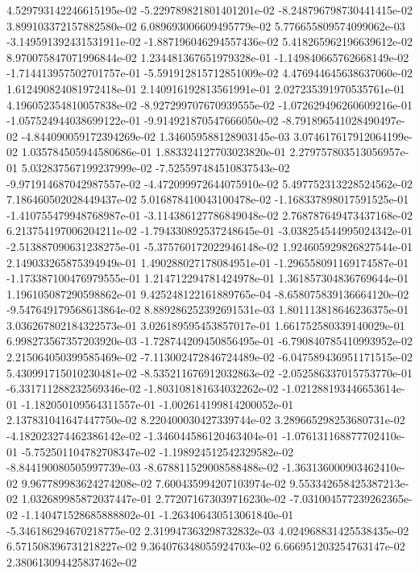 4.529793142246615195e-02
-5.229789821801401201e-02
-8.248796798730441415e-02
3.899103372157882580e-02
6.089693006609495779e-02
5.776655809574099062e-03
-3.149591392431531911e-02
-1.887196046294557436e-02
5.418265962196639612e-02
8.970075847071996844e-02
1.234481367651979328e-01
-1.149840665762668149e-02
-1.714413957502701757e-01
-5.591912815712851009e-02
4.476944645638637060e-02
1.612490824081972418e-01
2.140916192813561991e-01
2.027235391970535761e-01
4.196052354810057838e-02
-8.927299707670939555e-02
-1.072629496260609216e-01
-1.057524944038699122e-01
-9.914921870547666050e-02
-8.791896541028490497e-02
-4.844090059172394269e-02
1.346059588128903145e-03
3.074617617912064199e-02
1.035784505944580686e-01
1.883324127703023820e-01
2.279757803513056957e-01
5.032837567199237999e-02
-7.525597484510837543e-02
-9.971914687042987557e-02
-4.472099972644075910e-02
5.497752313228524562e-02
7.186460502028449437e-02
5.016878410043100478e-02
-1.168337898017591525e-01
-1.410755479948768987e-01
-3.114386127786849048e-02
2.768787649473437168e-02
6.213754197006204211e-02
-1.794330892537248645e-01
-3.038254544995024342e-01
-2.513887090631238275e-01
-5.375760172022946148e-02
1.924605929826827544e-01
2.149033265875394949e-01
1.490288027178084951e-01
-1.296558091169174587e-01
-1.173387100476979555e-01
1.214712294781424978e-01
1.361857304836769644e-01
1.196105087290598862e-01
9.425248122161889765e-04
-8.658075839136664120e-02
-9.547649179568613864e-02
8.889286252392691531e-03
1.801113818646236375e-01
3.036267802184322573e-01
3.026189595453857017e-01
1.661752580339140029e-01
6.998273567357203920e-03
-1.728744209450856495e-01
-6.790840785410993952e-02
2.215064050399585469e-02
-7.113002472846724489e-02
-6.047589436951171515e-02
5.430991715010230481e-02
-8.535211676912032863e-02
-2.052586337015753770e-01
-6.331711288232569346e-02
-1.803108181634032262e-02
-1.021288193446653614e-01
-1.182050109564311557e-01
-1.002614199814200052e-01
2.137831041647447750e-02
8.220400030427339744e-02
3.289665298253680731e-02
-4.182023274462386142e-02
-1.346044586120463404e-01
-1.076131168877702410e-01
-5.752501104782708347e-02
-1.198924512542329582e-02
-8.844190080505997739e-03
-8.678811529008588488e-02
-1.363136000903462410e-02
9.967789983624274208e-02
7.600435994207103974e-02
9.553342658425387213e-02
1.032689985872037447e-01
2.772071673039716230e-02
-7.031004577239262365e-02
-1.140471528685888802e-01
-1.263406430513061840e-01
-5.346186294670218775e-02
2.319947363298732832e-03
4.024968831425538435e-02
6.571508396731218227e-02
9.364076348055924703e-02
6.666951203254763147e-02
2.380613094425837462e-02
